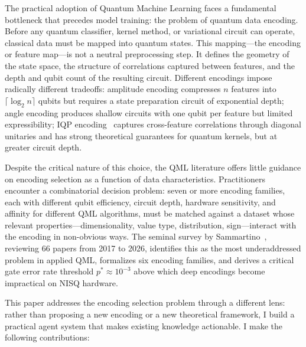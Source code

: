 \documentclass[sigconf,nonacm]{acmart}
\begin{document}
The practical adoption of Quantum Machine Learning faces a fundamental bottleneck
that precedes model training: the problem of quantum data encoding. Before any
quantum classifier, kernel method, or variational circuit can operate, classical
data must be mapped into quantum states. This mapping---the encoding or feature
map---is not a neutral preprocessing step. It defines the geometry of the state
space, the structure of correlations captured between features, and the depth and
qubit count of the resulting circuit. Different encodings impose radically different
tradeoffs: amplitude encoding compresses $n$ features into $\lceil \log_2 n \rceil$
qubits but requires a state preparation circuit of exponential depth; angle encoding
produces shallow circuits with one qubit per feature but limited expressibility;
IQP encoding~\cite{havlicek2019} captures cross-feature correlations through
diagonal unitaries and has strong theoretical guarantees for quantum kernels, but at
greater circuit depth.

Despite the critical nature of this choice, the QML literature offers little
guidance on encoding selection as a function of data characteristics. Practitioners
encounter a combinatorial decision problem: seven or more encoding families, each
with different qubit efficiency, circuit depth, hardware sensitivity, and affinity
for different QML algorithms, must be matched against a dataset whose relevant
properties---dimensionality, value type, distribution, sign---interact with the
encoding in non-obvious ways. The seminal survey by Sammartino~\cite{sammartino2026},
reviewing 66 papers from 2017 to 2026, identifies this as the most underaddressed
problem in applied QML, formalizes six encoding families, and derives a critical gate
error rate threshold $p^{*} \approx 10^{-3}$ above which deep encodings become
impractical on NISQ hardware.

This paper addresses the encoding selection problem through a different lens: rather
than proposing a new encoding or a new theoretical framework, I build a practical
agent system that makes existing knowledge actionable. I make the following
contributions:
\end{document}
